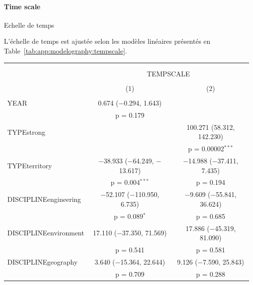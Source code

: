\paragraph{Time scale}{Echelle de temps}

L'échelle de temps est ajustée selon les modèles linéaires présentés en Table~\ref{tab:app:modelography:tempscale}.


\begin{table}%
\begin{tabular}{@{\extracolsep{5pt}}lcc} 
\\[-1.8ex]\hline 
\hline \\[-1.8ex] 
\\[-1.8ex] & \multicolumn{2}{c}{TEMPSCALE} \\ 
\\[-1.8ex] & (1) & (2)\\ 
\hline \\[-1.8ex] 
 YEAR & 0.674 ($-$0.294, 1.643) &  \\ 
  & p = 0.179 &  \\ 
  TYPEstrong &  & 100.271 (58.312, 142.230) \\ 
  &  & p = 0.00002$^{***}$ \\ 
  TYPEterritory & $-$38.933 ($-$64.249, $-$13.617) & $-$14.988 ($-$37.411, 7.435) \\ 
  & p = 0.004$^{***}$ & p = 0.194 \\ 
  DISCIPLINEengineering & $-$52.107 ($-$110.950, 6.735) & $-$9.609 ($-$55.841, 36.624) \\ 
  & p = 0.089$^{*}$ & p = 0.685 \\ 
  DISCIPLINEenvironment & 17.110 ($-$37.350, 71.569) & 17.886 ($-$45.319, 81.090) \\ 
  & p = 0.541 & p = 0.581 \\ 
  DISCIPLINEgeography & 3.640 ($-$15.364, 22.644) & 9.126 ($-$7.590, 25.843) \\ 
  & p = 0.709 & p = 0.288 \\ 

\end{tabular}
\end{table}
